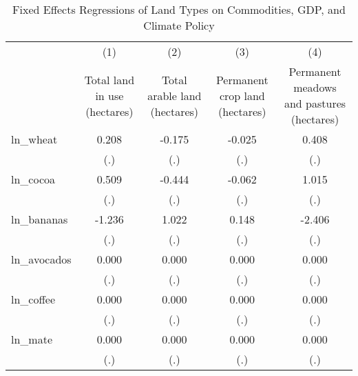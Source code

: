 \begin{table}[htbp]\centering
\def\sym#1{\ifmmode^{#1}\else\(^{#1}\)\fi}
\caption{Fixed Effects Regressions of Land Types on Commodities, GDP, and Climate Policy}
\begin{tabular}{l*{4}{c}}
\toprule
                    &\multicolumn{1}{c}{(1)}&\multicolumn{1}{c}{(2)}&\multicolumn{1}{c}{(3)}&\multicolumn{1}{c}{(4)}\\
                    &\multicolumn{1}{c}{Total land in use (hectares)}&\multicolumn{1}{c}{Total arable land (hectares)}&\multicolumn{1}{c}{Permanent crop land (hectares)}&\multicolumn{1}{c}{Permanent meadows and pastures (hectares)}\\
\midrule
ln\_wheat            &       0.208         &      -0.175         &      -0.025         &       0.408         \\
                    &         (.)         &         (.)         &         (.)         &         (.)         \\
\addlinespace
ln\_cocoa            &       0.509         &      -0.444         &      -0.062         &       1.015         \\
                    &         (.)         &         (.)         &         (.)         &         (.)         \\
\addlinespace
ln\_bananas          &      -1.236         &       1.022         &       0.148         &      -2.406         \\
                    &         (.)         &         (.)         &         (.)         &         (.)         \\
\addlinespace
ln\_avocados         &       0.000         &       0.000         &       0.000         &       0.000         \\
                    &         (.)         &         (.)         &         (.)         &         (.)         \\
\addlinespace
ln\_coffee           &       0.000         &       0.000         &       0.000         &       0.000         \\
                    &         (.)         &         (.)         &         (.)         &         (.)         \\
\addlinespace
ln\_mate             &       0.000         &       0.000         &       0.000         &       0.000         \\
                    &         (.)         &         (.)         &         (.)         &         (.)         \\

\end{tabular}
\end{table}
